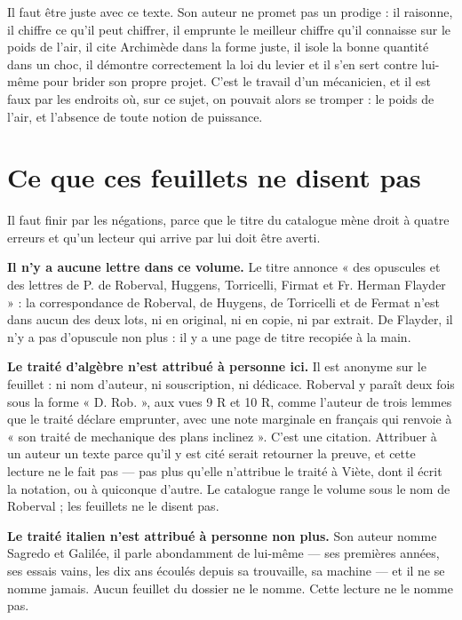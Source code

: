 \documentclass[11pt,a4paper]{article}
\begin{document}
Il faut être juste avec ce texte. Son auteur ne promet pas un prodige : il
raisonne, il chiffre ce qu'il peut chiffrer, il emprunte le meilleur chiffre
qu'il connaisse sur le poids de l'air, il cite Archimède dans la forme juste,
il isole la bonne quantité dans un choc, il démontre correctement la loi du
levier et il s'en sert contre lui-même pour brider son propre projet. C'est le
travail d'un mécanicien, et il est faux par les endroits où, sur ce sujet, on
pouvait alors se tromper : le poids de l'air, et l'absence de toute notion de
puissance.

\section*{Ce que ces feuillets ne disent pas}

Il faut finir par les négations, parce que le titre du catalogue mène droit à
quatre erreurs et qu'un lecteur qui arrive par lui doit être averti.

\textbf{Il n'y a aucune lettre dans ce volume.} Le titre annonce « des opuscules
et des lettres de P. de Roberval, Huggens, Torricelli, Firmat et Fr. Herman
Flayder » : la correspondance de Roberval, de Huygens, de Torricelli et de Fermat
n'est dans aucun des deux lots, ni en original, ni en copie, ni par extrait. De
Flayder, il n'y a pas d'opuscule non plus : il y a une page de titre recopiée à
la main.

\textbf{Le traité d'algèbre n'est attribué à personne ici.} Il est anonyme sur le
feuillet : ni nom d'auteur, ni souscription, ni dédicace. Roberval y paraît
deux fois sous la forme « D. Rob. », aux vues 9 R et 10 R, comme l'auteur de
trois lemmes que le traité déclare emprunter, avec une note marginale en
français qui renvoie à « son traité de mechanique des plans inclinez ». C'est
une citation. Attribuer à un auteur un texte parce qu'il y est cité serait
retourner la preuve, et cette lecture ne le fait pas — pas plus qu'elle
n'attribue le traité à Viète, dont il écrit la notation, ou à quiconque d'autre.
Le catalogue range le volume sous le nom de Roberval ; les feuillets ne le
disent pas.

\textbf{Le traité italien n'est attribué à personne non plus.} Son auteur nomme
Sagredo et Galilée, il parle abondamment de lui-même — ses premières années, ses
essais vains, les dix ans écoulés depuis sa trouvaille, sa machine — et il ne se
nomme jamais. Aucun feuillet du dossier ne le nomme. Cette lecture ne le nomme
pas.
\end{document}
